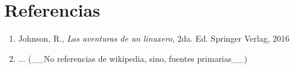 \documentclass[letterpaper]{article}
\begin{document}
\section{Referencias}

\begin{enumerate}
\item Johnson, R., \textit{Las aventuras de un linuxero}, 2da. Ed. Springer Verlag, 2016
\item ... (\_\_No referencias de wikipedia, sino, fuentes primarias\_\_)
\end{enumerate}
	
\end{document}
